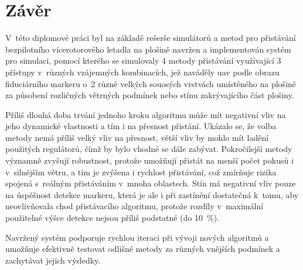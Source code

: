 \chapter{Závěr} \label{chap:conclusion}

V~této diplomové práci byl na základě rešerše simulátorů a metod pro přistávání bezpilotního vícerotorového letadla na plošině navržen a implementován systém pro simulaci, pomocí kterého se simulovaly 4 metody přistávání využívající 3 přístupy v~různých vzájemných kombinacích, jež naváděly \acrshort{uav} podle obrazu fiduciárního markeru o~2 různě velkých souosých vrstvách umístěného na plošině za působení rozličných větrných podmínek nebo stínu zakrývajícího část plošiny. 

Příliš dlouhá doba trvání jednoho kroku algoritmu může mít negativní vliv na jeho dynamické vlastnosti a tím i na přesnost přistání. Ukázalo se, že volba metody nemá příliš velký vliv na přesnost, větší vliv by mohlo mít ladění použitých regulátorů, čímž by bylo vhodné se dále zabývat. Pokročilejší metody významně zvyšují robustnost, protože umožňují přistát na menší počet pokusů i v~silnějším větru, a tím je zvýšena i rychlost přistávání, což zmírňuje rizika spojená s~reálným přistáváním v~mnoha oblastech. Stín má negativní
vliv pouze na úspěšnost detekce markeru, která je ale i při zastínění dostatečná k~tomu, aby neovlivňovala chod přistávacího algoritmu, protože rozdíly v~maximální použitelné výšce detekce nejsou příliš podstatné (do 10~\%).

Navržený systém podporuje rychlou iteraci při vývoji nových algoritmů a umožňuje efektivně testovat odlišné metody za různých vnějších podmínek a zachytávat jejich výsledky.